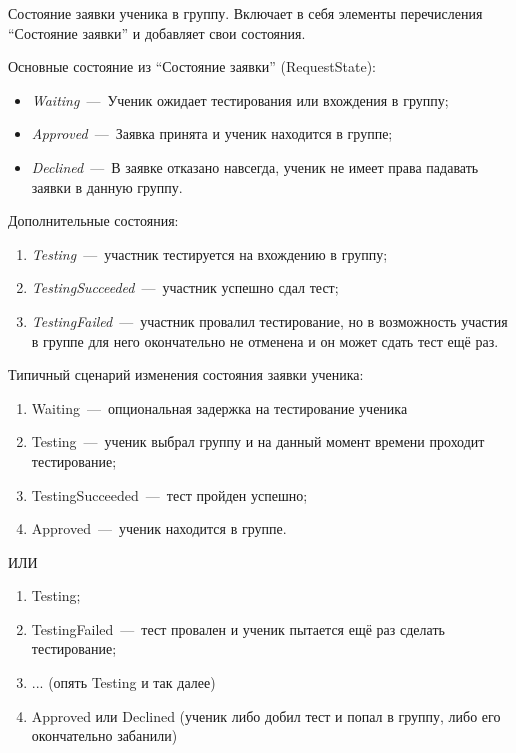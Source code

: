 \documentclass[14pt]{article}
\begin{document}
Состояние заявки ученика в группу. Включает в себя элементы перечисления ``Состояние заявки'' и добавляет свои состояния.

Основные состояние из ``Состояние заявки'' (RequestState):

\begin{itemize}
	\item \emph{Waiting}~---~Ученик ожидает тестирования или вхождения в группу;
	\item \emph{Approved}~---~Заявка принята и ученик находится в группе;
	\item \emph{Declined}~---~В заявке отказано навсегда, ученик не имеет права падавать заявки в данную группу.
\end{itemize}

Дополнительные состояния:
\begin{enumerate}
	\item \emph{Testing}~---~участник тестируется на вхождению в группу;
	\item \emph{TestingSucceeded}~---~участник успешно сдал тест;
	\item \emph{TestingFailed}~---~участник провалил тестирование, но в возможность участия в группе для него окончательно не отменена и он может сдать тест ещё раз.
\end{enumerate}

Типичный сценарий изменения состояния заявки ученика:

\begin{enumerate}
	\item Waiting~---~опциональная задержка на тестирование ученика
	\item Testing~---~ученик выбрал группу и на данный момент времени проходит тестирование;
	\item TestingSucceeded~---~тест пройден успешно;
	\item Approved~---~ученик находится в группе.
\end{enumerate}

ИЛИ

\begin{enumerate}
	\item Testing;
	\item TestingFailed~---~тест провален и ученик пытается ещё раз сделать тестирование;
	\item ... (опять Testing и так далее)
	\item Approved или Declined (ученик либо добил тест и попал в группу, либо его окончательно забанили)
\end{enumerate}
\end{document}
